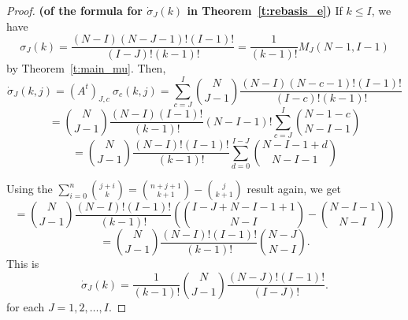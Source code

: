 \documentclass[11pt]{amsart}   %
\theoremstyle{definition}
\theoremstyle{remark}
\numberwithin{equation}{section}
\theoremstyle{theorem}
\begin{document}
\begin{proof}{\bf (of the formula for $\dot\sigma_J(k)$ in Theorem~\ref{t:rebasis_e})}
If $k \leq I$, we have 
\[  \sigma_J(k) =  \frac{(N-I)(N-J-1)!(I-1)!}{(I-J)!(k-1)!} = \frac{1}{(k-1)!} M_J(N-1, I-1)  \]
by Theorem~\ref{t:main_mu}.
Then,
\[ \dot\sigma_J(k, j) = \left(A^t\right)_{J, c} \ \sigma_c(k, j) = \sum_{c = J}^{I} {N \choose {J-1}} \frac{(N-I)(N-c-1)!(I-1)!}{(I-c)!(k-1)!} \]
\[ %
   =  {N \choose {J-1}} \frac{(N-I)(I-1)!}{(k-1)!} (N-I-1)! \sum_{c = J}^{I} { {N-1-c} \choose {N-I-1} } \]
\[ =  {N \choose {J-1}} \frac{(N-I)!(I-1)!}{(k-1)!} \sum_{d = 0}^{I-J} { {N-I-1+d} \choose {N-I-1} } \]

Using the $\sum_{i=0}^n { {j+i} \choose {k} } = { {n+j+1} \choose {k+1} } - {j \choose {k+1}}$ result again, we get
\[ =  {N \choose {J-1}} \frac{(N-I)!(I-1)!}{(k-1)!} \left( { {I-J + N-I-1 +1} \choose {N-I} } - { {N-I-1} \choose {N-I} } \right) \]
\[ =  {N \choose {J-1}} \frac{(N-I)!(I-1)!}{(k-1)!}  { {N-J} \choose {N-I} }.  \]
This is
\[ \dot\sigma_J(k) = \frac{1}{(k-1)!} {N \choose {J-1}} \frac{(N-J)!(I-1)!}{(I-J)!}. \]
for each $J = 1, 2, \ldots, I$.
\end{proof}
\end{document}
